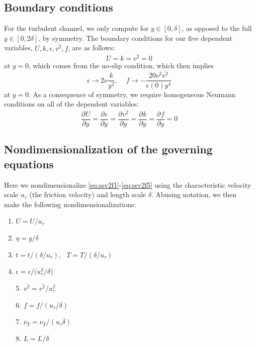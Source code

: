 \documentclass[a4paper,11pt]{article}
\newcommand{\pderiv}[3][]{%
  \ensuremath{\frac{\partial^{#1} {#2}}{\partial {#3}^{#1}}}}
\newcommand{\ep}{\epsilon}
\begin{document}
\subsection{Boundary conditions}
For the turbulent channel, we only compute for $y \in [0,\delta] $, as opposed to the full $y \in [0,2\delta]$, by symmetry. The boundary conditions for our five dependent variables, $U, k, \ep, \overline{v^2}, f$, are as follows: 
\[
U = k = \overline{v^2} = 0 
\]
at $y = 0$, which comes from the no-slip condition, which then implies 
\[
\epsilon \to 2\nu \frac{k}{y^2}, \,\,\,\,\,\,\, f \to -\frac{20 \nu^2 \overline{v^2} }{\ep(0) y^4}
\]
at $y = 0$. As a consequence of symmetry, we require homogeneous Neumann conditions on all of the dependent variables: 
\[
\pderiv{U}{y}= \pderiv{\ep}{y} = \pderiv{\overline{v^2}}{y} = \pderiv{k}{y} = \pderiv{f}{y} = 0
\] 

\subsection{Nondimensionalization of the governing equations} 
Here we nondimensionalize \eqref{eq:ssv2f1}-\eqref{eq:ssv2f5} using the
characteristic velocity scale $u_{\tau}$ (the friction velocity) and length
scale $\delta$. Abusing notation, we then make the following nondimensionalizations:

\begin{multicols}{2}
\begin{enumerate}
\item $U = U\big/u_{\tau}$
\item $\eta  = y\Big/\delta$
\item $t = t\Big/(\delta/u_{\tau}), \,\,\,\, T = T\Big/(\delta/u_{\tau})$
\item $\epsilon = \epsilon\Big/(u_{\tau}^3/\delta$)
\end{enumerate}
\columnbreak 

\begin{itemize}
\item[5.] $\overline{v^2} = \overline{v^2}\Big/u_{\tau}^2$
\item[6.] $f = f\Big/(u_{\tau}/\delta)$
\item[7.] $\nu_T = \nu_T\Big/(u_{\tau} \delta)$
\item[8.] $L = L/\delta$

\end{itemize}
\end{multicols}
\end{document}
